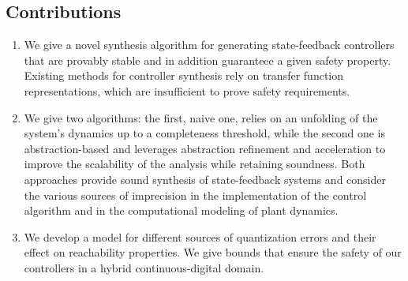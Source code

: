 \documentclass[runningheads,a4paper]{llncs}
\begin{document}
\subsection*{Contributions} 

\begin{enumerate}
%
\item  We give a novel synthesis algorithm for generating
  state-feedback controllers that are provably stable and in addition
  guaranteee a given safety property. Existing methods for controller
  synthesis rely on transfer function representations, which are
  insufficient to prove safety requirements.
%
\item We give two algorithms: the first, naive one, relies on
  an unfolding of the system's dynamics up to a completeness threshold,
  while the second one is abstraction-based and leverages abstraction
  refinement and acceleration to improve the scalability of the analysis
  while retaining soundness.  Both approaches provide sound synthesis of
  state-feedback systems and consider the various sources of imprecision in
  the implementation of the control algorithm and in the computational
  modeling of plant dynamics.
%
\item We develop a model for different sources of quantization errors and
  their effect on reachability properties.  We give bounds that ensure the
  safety of our controllers in a hybrid continuous-digital domain.
%
\end{enumerate}

\end{document}
